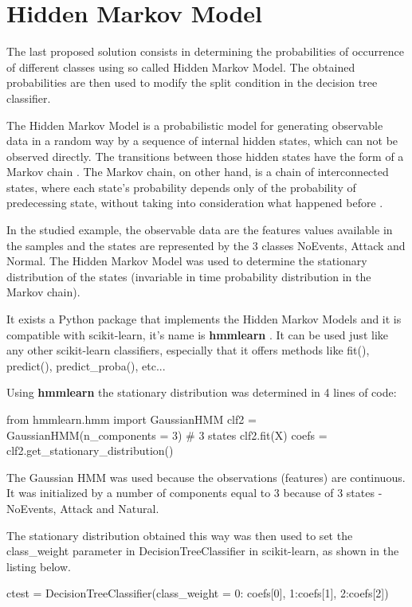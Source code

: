 \section{Hidden Markov Model}
The last proposed solution consists in determining the probabilities of occurrence of different classes using so called Hidden Markov Model. The obtained probabilities are then used to modify the split condition in the decision tree classifier. 

The Hidden Markov Model is a probabilistic model for generating observable data in a random way by a sequence of internal hidden states, which can not be observed directly. The transitions between those hidden states have the form of a Markov chain \cite{noauthor_tutorial_nodate}. The Markov chain, on other hand, is a chain of interconnected states, where each state's probability depends only of the probability of predecessing state, without taking into consideration what happened before \cite{amit_introduction_2019}.

In the studied example, the observable data are the features values available in the samples and the states are represented by the 3 classes NoEvents, Attack and Normal. The Hidden Markov Model was used to determine the stationary distribution of the states (invariable in time probability distribution in the Markov chain).

It exists a Python package that implements the Hidden Markov Models and it is compatible with scikit-learn, it's name is \textbf{hmmlearn} \cite{noauthor_hmmlearn_2020}. It can be used just like any other scikit-learn classifiers, especially that it offers methods like fit(), predict(), predict\_proba(), etc...

Using \textbf{hmmlearn} the stationary distribution was determined in 4 lines of code:
\begin{python}
from hmmlearn.hmm import GaussianHMM 
clf2 = GaussianHMM(n_components = 3) # 3 states
clf2.fit(X)
coefs = clf2.get_stationary_distribution()
\end{python}
The Gaussian HMM was used because the observations (features) are continuous. It was initialized by a number of components equal to 3 because of 3 states - NoEvents, Attack and Natural.

The stationary distribution obtained this way was then used to set the class\_weight parameter in DecisionTreeClassifier in scikit-learn, as shown in the listing below.

\begin{python}
ctest = DecisionTreeClassifier(class_weight = {0: coefs[0], 1:coefs[1], 2:coefs[2]})  
\end{python}

